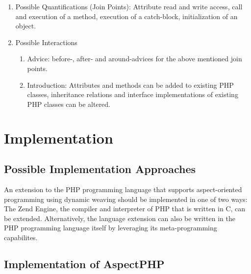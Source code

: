 \documentclass[landscape,a0]{a0poster}
\begin{document}
\begin{poster}
\begin{pcolumn}
\begin{pbox}
\begin{enumerate}
      \item

        Possible Quantifications (Join Points): Attribute read and write access,
        call and execution of a method, execution of a catch-block,
        initialization of an object.

      \item

         Possible Interactions

        \begin{enumerate}

          \item

            Advice: before-, after- and around-advices for the above mentioned
            join points.

          \item

            Introduction: Attributes and methods can be added to existing PHP
            classes, inheritance relations and interface implementations of
            existing PHP classes can be altered.

        \end{enumerate}

    \end{enumerate}

  \section{Implementation}

    \subsection{Possible Implementation Approaches}

      An extension to the PHP programming language that supports aspect-oriented
      programming using dynamic weaving should be implemented in one of two ways:
      The Zend Engine, the compiler and interpreter of PHP that is written in C,
      can be extended. Alternatively, the language extension can also be written
      in the PHP programming language itself by leveraging its meta-programming
      capabilites.

    \subsection{Implementation of AspectPHP}


\end{pbox}
\end{pcolumn}
\end{poster}
\end{document}
